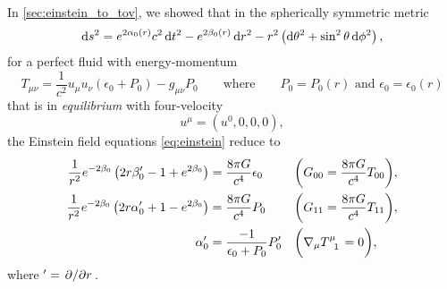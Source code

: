 In \cref{sec:einstein_to_tov}, we showed that in the spherically symmetric metric
\begin{equation}
	\mathop{}\!\mathrm{d} s^2 = e^{2 \alpha_0(r)} c^2 \mathop{}\!\mathrm{d} t^2 - e^{2 \beta_0(r)} \mathop{}\!\mathrm{d} r^2 - r^2 \left( \mathop{}\!\mathrm{d} \theta^2 + \sin^2 \theta \mathop{}\!\mathrm{d} \phi^2 \right) ,
\end{equation}
for a perfect fluid with energy-momentum
\begin{equation}
	T_{\mu \nu} = \frac{1}{c^2} u_\mu u_\nu (\epsilon_0 + P_0) - g_{\mu \nu} P_0
	\qquad \text{where} \qquad
	P_0 = P_0(r) \text{ and } \epsilon_0 = \epsilon_0(r)
\label{eq:nstars:energy_momentum}
\end{equation}
that is in \emph{equilibrium} with four-velocity
\begin{equation}
	u^\mu = (u^0, 0, 0, 0) ,
\label{eq:nstars:velocity_equilibrium}
\end{equation}
the Einstein field equations \eqref{eq:einstein} reduce to
\begin{subequations}%
\begin{align}%
	\frac{1}{r^2} e^{-2 \beta_0} \left( 2 r \beta_0' - 1 + e^{2 \beta_0} \right)  &= \frac{8 \pi G}{c^4} \epsilon_0   && \bigg( G_{00} = \frac{8 \pi G}{c^4} T_{00} \bigg) , \label{eq:nstars:field_equations_equilibrium_00} \\
	\frac{1}{r^2} e^{-2 \beta_0} \left( 2 r \alpha_0' + 1 - e^{2 \beta_0} \right) &= \frac{8 \pi G}{c^4} P_0          && \bigg( G_{11} = \frac{8 \pi G}{c^4} T_{11} \bigg) , \label{eq:nstars:field_equations_equilibrium_11} \\
	\alpha_0'                                                                     &= \frac{-1}{\epsilon_0 + P_0} P_0' && \bigg( \nabla_\mu T\indices{^\mu_1} = 0 \bigg)    , \label{eq:nstars:field_equations_equilibrium_T}
\end{align}%
\label{eq:nstars:field_equations_equilibrium}%
\end{subequations}%
where $' = \pdv{}/{r}$.

